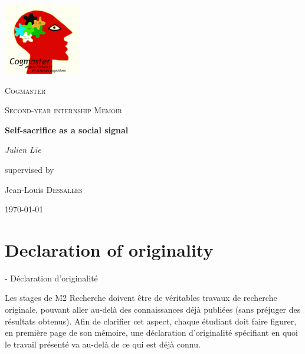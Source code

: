 \documentclass[a4paper,12pt]{report}
\begin{document}
\setlength{\parindent}{0pt}
\setlength{\parskip}{6pt}

\begin{titlepage}
	\centering
    \includegraphics[width=0.25\textwidth]{cogmaster}\par\vspace{1cm}
	{\scshape\LARGE Cogmaster \par}
	\vspace{1cm}
	{\scshape\Large Second-year internship Memoir\par}
	\vspace{1.5cm}
	{\huge\bfseries Self-sacrifice as a social signal\par}
	\vspace{2cm}
	{\Large\itshape Julien Lie\par}
	\vfill
	supervised by\par
	Jean-Louis \textsc{Dessalles}

	\vfill

	{\large \today\par}
\end{titlepage}





\tableofcontents\newpage{}

\chapter*{Declaration of originality}
- Déclaration d'originalité

Les stages de M2 Recherche doivent être de véritables travaux de recherche originale, pouvant aller au-delà des connaissances déjà publiées (sans préjuger des résultats obtenus). Afin de clarifier cet aspect, chaque étudiant doit faire figurer, en première page de son mémoire, une déclaration d'originalité spécifiant en quoi le travail présenté va au-delà de ce qui est déjà connu.
\end{document}
